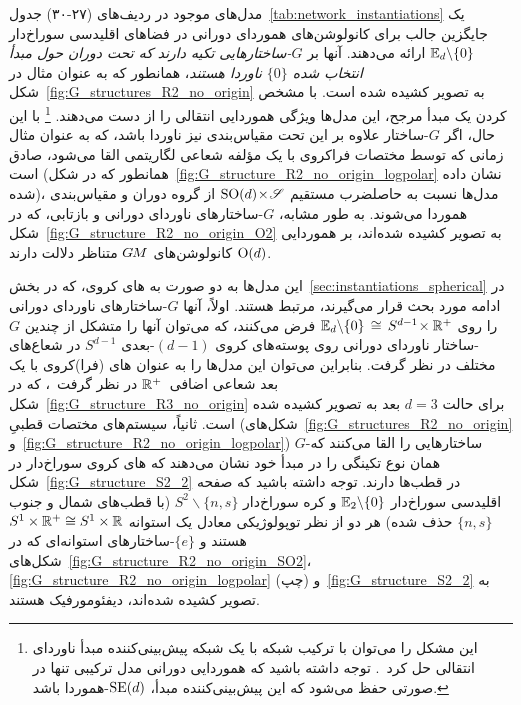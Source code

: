 مدل‌های موجود در ردیف‌های (۲۷-۳۰) جدول~\ref{tab:network_instantiations}
یک جایگزین جالب برای کانولوشن‌های هموردای دورانی در فضاهای اقلیدسی سوراخ‌دار $\mathbb{E}_d\backslash\{0\}$ ارائه می‌دهند.
آنها بر \emph{$G$-ساختارهایی تکیه دارند که تحت دوران حول مبدأ انتخاب شده $\{0\}$ ناوردا هستند}، همانطور که به عنوان مثال در شکل~\ref{fig:G_structures_R2_no_origin} به تصویر کشیده شده است.
با مشخص کردن یک مبدأ مرجح، این مدل‌ها ویژگی هموردایی انتقالی را از دست می‌دهند.%
\footnote{
	این مشکل را می‌توان با ترکیب شبکه با یک شبکه پیش‌بینی‌کننده مبدأ ناوردای انتقالی حل کرد~\cite{esteves2017polar}.
	توجه داشته باشید که هموردایی دورانی مدل ترکیبی تنها در صورتی حفظ می‌شود که این پیش‌بینی‌کننده مبدأ، $\operatorname{SE}(d)$-هموردا باشد.
}
با این حال، اگر $G$-ساختار علاوه بر این تحت مقیاس‌بندی نیز ناوردا باشد، که به عنوان مثال زمانی که توسط مختصات فراکروی با یک مؤلفه شعاعی لگاریتمی القا می‌شود، صادق است (همانطور که در شکل~\ref{fig:G_structure_R2_no_origin_logpolar} نشان داده شده)، مدل‌ها نسبت به حاصلضرب مستقیم $\operatorname{SO}(d) \!\times\! \mathscr{S}$ از گروه دوران و مقیاس‌بندی هموردا می‌شوند.
به طور مشابه، $G$-ساختارهای ناوردای دورانی و بازتابی، که در شکل~\ref{fig:G_structure_R2_no_origin_O2} به تصویر کشیده شده‌اند، بر هموردایی $\operatorname{O}(d)$ کانولوشن‌های $G\mkern-1.4muM$ متناظر دلالت دارند.


این مدل‌ها به دو صورت به های کروی، که در بخش~\ref{sec:instantiations_spherical} در ادامه مورد بحث قرار می‌گیرند، مرتبط هستند.
اولاً، آنها $G$-ساختارهای ناوردای دورانی را روی $\mathbb{E}_d \backslash \{0\} \,\cong\, S^{d-1} \!\times \mathbb{R}^+$ فرض می‌کنند، که می‌توان آنها را متشکل از چندین $G$-ساختار ناوردای دورانی روی پوسته‌های کروی ${(d -\! 1)}$-بعدی $S^{d-1}$ در شعاع‌های مختلف در نظر گرفت.
بنابراین می‌توان این مدل‌ها را به عنوان های (فرا)کروی با یک بعد شعاعی اضافی~$\mathbb{R}^+$ در نظر گرفت~\cite{ramasinghe2019representation}، که در شکل~\ref{fig:G_structure_R3_no_origin} برای حالت $d=3$ بعد به تصویر کشیده شده است.
ثانیاً، سیستم‌های مختصات قطبیِ \cite{esteves2017polar,finzi2020generalizing,chidester2019rotation} (شکل‌های~\ref{fig:G_structures_R2_no_origin} و~\ref{fig:G_structure_R2_no_origin_logpolar}) $G$-ساختارهایی را القا می‌کنند که همان نوع تکینگی را در مبدأ خود نشان می‌دهند که های کروی سوراخ‌دار در شکل~\ref{fig:G_structure_S2_2} در قطب‌ها دارند.
توجه داشته باشید که صفحه اقلیدسی سوراخ‌دار $\mathbb{E}_2 \backslash \{0\}$ و کره سوراخ‌دار $S^2 \backslash \{n,s\}$ (با قطب‌های شمال و جنوب $\{n,s\}$ حذف شده) هر دو از نظر توپولوژیکی معادل یک استوانه $S^1 \times \mathbb{R}^+ \cong S^1 \times \mathbb{R}$ هستند و $\{e\}$-ساختارهای استوانه‌ای که در شکل‌های~\ref{fig:G_structure_R2_no_origin_SO2}، \ref{fig:G_structure_R2_no_origin_logpolar} (چپ) و~\ref{fig:G_structure_S2_2} به تصویر کشیده شده‌اند، دیفئومورفیک هستند.


